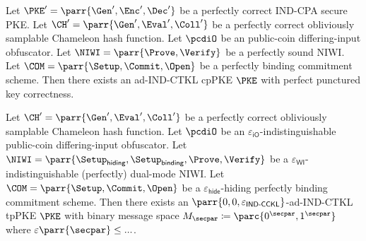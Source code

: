 \begin{theorem}[Informal]
    Let \(\PKE' = \parr{\Gen',\Enc',\Dec'}\) be a perfectly correct IND-CPA secure PKE.
    Let \(\CH' = \parr{\Gen',\Eval',\Coll'}\) be a perfectly correct obliviously samplable Chameleon hash function.
    Let \(\pcdiO\) be an public-coin differing-input obfuscator.
    Let \(\NIWI = \parr{\Prove,\Verify}\) be a perfectly sound NIWI.
    Let \(\COM = \parr{\Setup,\Commit,\Open}\) be a perfectly binding commitment scheme.
    Then there exists an ad-IND-CTKL cpPKE \(\PKE\) with perfect punctured key correctness.
\end{theorem}

\begin{theorem}\label{thm:construction-of-perfect-PK-correctness}
    Let \(\CH' = \parr{\Gen',\Eval',\Coll'}\) be a perfectly correct obliviously samplable Chameleon hash function.
    Let \(\pcdiO\) be an \(\varepsilon_{\textsf{iO}}\)-indistinguishable public-coin differing-input obfuscator.
    Let \(\NIWI = \parr{\Setup_{\textsf{hiding}},\Setup_{\textsf{binding}},\Prove,\Verify}\) be a \(\varepsilon_{\textsf{WI}}\)-indistinguishable (perfectly) dual-mode NIWI.
    Let \(\COM = \parr{\Setup,\Commit,\Open}\) be a \(\varepsilon_{\textsf{hide}}\)-hiding perfectly binding commitment scheme.
    Then there exists an \(\parr{0,0,\varepsilon_{\textsf{IND-CCKL}}}\)-ad-IND-CTKL tpPKE \(\PKE\) with binary message space \(M_\secpar \coloneq \parc{0^\secpar,1^\secpar}\) where \(\varepsilon\parr{\secpar} \leq ...\).
\end{theorem}

